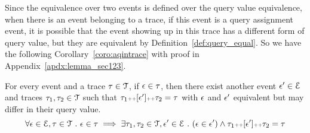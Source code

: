 %
Since the equivalence over two events is defined over the query value equivalence, 
when there is an event belonging to a trace, 
if this event is a query assignment event, 
it is possible that 
the event showing up in this trace has a different form of query value, 
but they are equivalent by Definition~\ref{def:query_equal}.
So we have the following Corollary~\ref{coro:aqintrace} with proof in Appendix~\ref{apdx:lemma_sec123}.
\begin{coro}
\label{coro:aqintrace}
For every event and a trace $\mathtt{\tau} \in \mathcal{T}$,
if $\mathtt{\epsilon} \in \mathtt{\tau}$, 
then there exist another event $\mathtt{\epsilon}' \in \mathcal{E}$ and traces $\mathtt{\tau}_1, \mathtt{\tau}_2 \in \mathcal{T}$
such that $\mathtt{\tau}_1 {\scriptscriptstyle ++} [\mathtt{\epsilon}'] {\scriptscriptstyle ++} \mathtt{\tau}_2 = \mathtt{\tau} $
with 
$\mathtt{\epsilon}$ and $\mathtt{\epsilon}'$ equivalent but may differ in their query value.
\[
  \forall \mathtt{\epsilon} \in \mathcal{E}, \mathtt{\tau} \in \mathcal{T} ~.~
\mathtt{\epsilon} \in \mathtt{\tau} \implies \exists \mathtt{\tau}_1, \mathtt{\tau}_2 \in \mathcal{T}, 
\mathtt{\epsilon}' \in \mathcal{E} ~.~ (\mathtt{\epsilon} \in \mathtt{\epsilon}') \land \mathtt{\tau}_1 {\scriptscriptstyle ++} [\mathtt{\epsilon}'] {\scriptscriptstyle ++} \mathtt{\tau}_2 = \mathtt{\tau}  
\]
\end{coro}